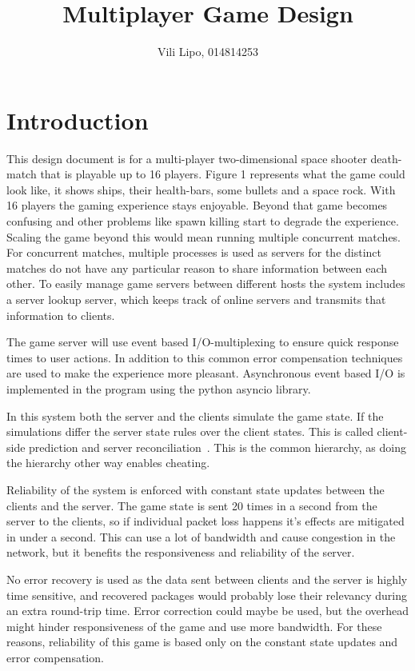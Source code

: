 \documentclass[10pt,a4paper]{article}
\author{Vili Lipo, 014814253}
\title{Multiplayer Game Design}
\begin{document}
 \maketitle
 \thispagestyle{plain}
 \section{Introduction}

 This design document is for a multi-player two-dimensional space shooter
 death-match that is playable up to 16 players.  Figure 1 represents what the
 game could look like, it shows ships, their health-bars, some bullets and a
 space rock.  With 16 players the gaming experience stays enjoyable. Beyond
 that game becomes confusing and other problems like spawn killing start to
 degrade the experience. Scaling the game beyond this would mean running
 multiple concurrent matches. For concurrent matches, multiple processes is
 used as servers for the distinct matches do not have any particular reason
 to share information between each other. To easily manage game servers
 between different hosts the system includes a server lookup server, which
 keeps track of online servers and transmits that information to clients.
 
 The game server will use event based I/O-multiplexing to ensure quick response
 times to user actions. In addition to this common error compensation
 techniques are used to make the experience more pleasant. Asynchronous event based
 I/O is implemented in the program using the python asyncio library.

 In this system both the server and the clients simulate the game state. If the
 simulations differ the server state rules over the client states.  This is
 called  client-side prediction and server reconciliation~\cite{gambetta_fast}.
 This is the common hierarchy, as doing the hierarchy other way enables
 cheating.

 Reliability of the system is enforced with constant state updates between the
 clients and the server. The game state is sent 20 times in a second from the
 server to the clients, so if individual packet loss happens it's effects are
 mitigated in under a second. This can use a lot of bandwidth and cause
 congestion in the network, but it benefits the responsiveness and reliability
 of the server.

 No error recovery is used as the data sent between clients and the server is
 highly time sensitive, and recovered packages would probably lose their
 relevancy during an extra round-trip time. Error correction could maybe be
 used, but the overhead might hinder responsiveness of the game and use more
 bandwidth. For these reasons, reliability of this game is based only on the
 constant state updates and error compensation.
\end{document}
